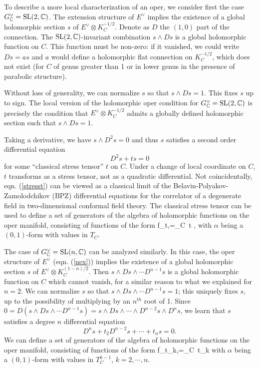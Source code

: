 \documentclass[11pt,a4paper]{article}
\begin{document}
To describe a more local characterization of an oper, we consider first the  case $G^\vee_{\mathbb C}={\mathrm{SL}}(2,{\mathbb C})$. The extension structure of $E^\vee$ implies the existence of  a
global holomorphic section $s$ of $E^\vee \otimes K_C^{-1/2}$. Denote as $D$ the $(1,0)$ part of the connection. 
The ${\mathrm{SL}}(2,{\mathbb C})$-invariant combination $s \wedge D s$ is a global holomorphic function on $C$. This function must be non-zero: 
if it vanished, we could write $D s= a s$ and $a$ would define a holomorphic flat connection on $K_C^{-1/2}$, which does not exist (for $C$ of genus greater than 1 or
in lower genus in the presence of parabolic structure).  

Without loss of generality, we can normalize $s$ so that $s \wedge D s=1$. This fixes $s$ up to sign.
The local version of the holomorphic oper condition for $G^\vee_{\mathbb C}={\mathrm{SL}}(2,{\mathbb C})$ is precisely the condition that $E^\vee \otimes K_C^{-1/2}$ admits a
globally defined holomorphic section such that $s \wedge D s=1$.

Taking a derivative, we have $s \wedge D^2 s =0$ and thus $s$ satisfies a second order differential equation
\begin{equation}\label{stresst}
D^2 s + t s=0
\end{equation}
for some ``classical stress tensor'' $t$ on $C$. 
Under a change of local coordinate on $C$, $t$ transforms as a stress tensor, not as a quadratic differential.    Not coincidentally, eqn. (\ref{stresst})
can be viewed as a classical limit of the 
 Belavin-Polyakov-Zamolodchikov (BPZ) differential equations for the correlator of a degenerate field in two-dimensional
conformal field theory. The classical stress tensor can be used to define a set of generators of the algebra of holomorphic 
functions on the oper manifold, consisting of functions of the form
\be\label{opjuno2} f_{t,\alpha}=\int_C \alpha \,t ,\ee
with $\alpha$ being a $(0,1)$-form with values in $T_C$. 



The case of $G^\vee_{\mathbb C}={\mathrm{SL}}(n,{\mathbb C})$ can be analyzed  similarly.   In this case, the oper structure of $E^\vee$ (eqn. (\ref{nex})) implies the existence of a
 global holomorphic section  $s$ of $E^\vee \otimes K_C^{(1-n)/2}$.   Then  $s \wedge D s \wedge \cdots D^{n-1} s$ is a global holomorphic function on $C$ which cannot vanish, for a similar reason to what we explained for $n=2$.   We can normalize $s$ so that $s \wedge D s \wedge \cdots D^{n-1} s=1$; this uniquely fixes $s$,
 up to the possibility of multiplying by an $n^{th}$ root of 1.   Since  $0=D(s \wedge D s \wedge \cdots D^{n-1} s)=s\wedge Ds \wedge \cdots \wedge  D^{n-2}s\wedge D^ns$, 
 we learn that $s$ satisfies a degree $n$ differential equation 
\begin{equation}
D^n s + t_2 D^{n-2} s+  \cdots + t_n s =0.
\end{equation}
We can define a set of generators of the algebra of  holomorphic functions on the oper manifold, consisting of functions of the form
\be\label{opjunon} f_{t_k,\alpha}=\int_C \alpha \,t_k \ee
with $\alpha$ being a $(0,1)$-form with values in $T_C^{k-1}$, $k=2,\cdots,n$. 
\end{document}
